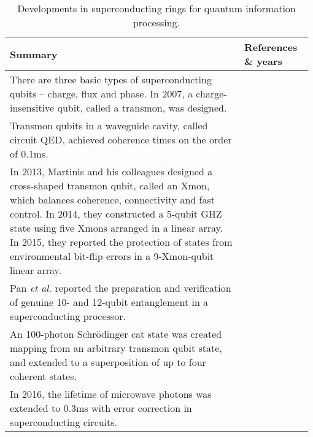 \begin{table*}[!htbp]
	\begin{tabular}{|p{0.755\linewidth}|p{0.22\linewidth}|}
		\hline
	\textbf{Summary} & \textbf{References \& years} \\	\hline \hline
		There are three basic types of superconducting qubits -- charge, flux and phase. In 2007, a charge-insensitive qubit, called a transmon, was designed. &  \cite{bib:koch2007charge} \\
		\hline
		 Transmon qubits in a waveguide cavity, called circuit QED, achieved coherence times on the order of 0.1ms. & \cite{bib:paik2011observation, bib:rigetti2012superconducting} \\
		\hline
		In 2013, Martinis and his colleagues designed a cross-shaped transmon qubit, called an Xmon, which balances coherence, connectivity and fast control. In 2014, they constructed a 5-qubit GHZ state using five Xmons arranged in a linear array. In 2015, they reported the protection of states from environmental bit-flip errors in a 9-Xmon-qubit linear array. &  \cite{bib:barends2013coherent, bib:barends2014superconducting, bib:kelly2015state} \\
		\hline
		Pan \textit{et al.} reported the preparation and verification of genuine 10- and 12-qubit entanglement in a superconducting processor. & \cite{bib:gong2018genuine, bib:song201710} \\		
		\hline
		An 100-photon Schr{\"o}dinger cat state was created mapping from an arbitrary transmon qubit state, and extended to a superposition of up to four coherent states. & \cite{bib:vlastakis2013deterministically} \\
		\hline
		In 2016, the lifetime of microwave photons was extended to 0.3ms with error correction in superconducting circuits. &  \cite{bib:ofek2016extending} \\
		\hline
	\end{tabular}
	\captionspacetab \caption{Developments in superconducting rings for quantum information processing.} \label{tab:superconducting}
\end{table*}

